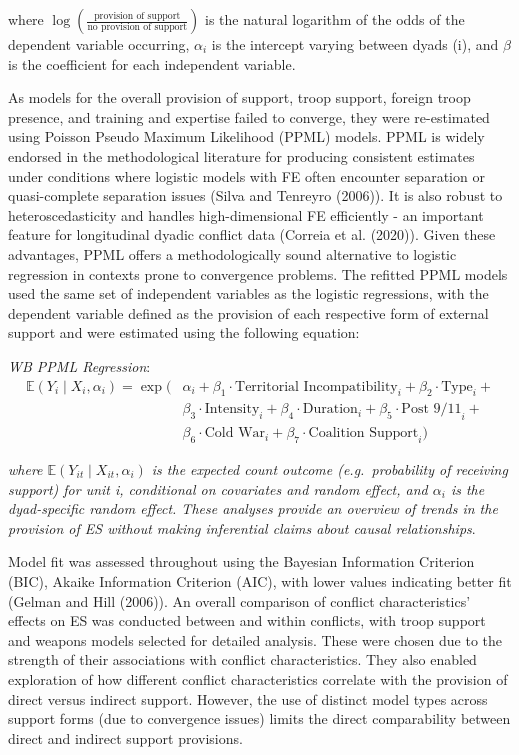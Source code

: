 \documentclass[
]{article}
\begin{document}
where
\(\log \left( \frac{\text{provision of support}}{\text{no provision of support}} \right)\)
is the natural logarithm of the odds of the dependent variable
occurring, \(\alpha_i\) is the intercept varying between dyads (i), and
\(\beta\) is the coefficient for each independent variable.

As models for the overall provision of support, troop support, foreign
troop presence, and training and expertise failed to converge, they were
re-estimated using Poisson Pseudo Maximum Likelihood (PPML) models. PPML
is widely endorsed in the methodological literature for producing
consistent estimates under conditions where logistic models with FE
often encounter separation or quasi-complete separation issues (Silva
and Tenreyro (2006)). It is also robust to heteroscedasticity and
handles high-dimensional FE efficiently - an important feature for
longitudinal dyadic conflict data (Correia et al. (2020)). Given these
advantages, PPML offers a methodologically sound alternative to logistic
regression in contexts prone to convergence problems. The refitted PPML
models used the same set of independent variables as the logistic
regressions, with the dependent variable defined as the provision of
each respective form of external support and were estimated using the
following equation:

\emph{WB PPML Regression}: \[
\begin{aligned}
\mathbb{E}(Y_{i} \mid X_{i}, \alpha_i) = \exp\bigg(&
\alpha_i + 
\beta_1 \cdot \text{Territorial Incompatibility}_{i} + 
\beta_2 \cdot \text{Type}_{i} + \\
&\beta_3 \cdot \text{Intensity}_{i} + 
\beta_4 \cdot \text{Duration}_{i} + 
\beta_5 \cdot \text{Post 9/11}_{i} + \\
&\beta_6 \cdot \text{Cold War}_{i} + 
\beta_7 \cdot \text{Coalition Support}_{i}
\bigg)
\end{aligned}
\]

\emph{where \(\mathbb{E}(Y_{it} \mid X_{it}, \alpha_i)\) is the expected
count outcome (e.g.~probability of receiving support) for unit i,
conditional on covariates and random effect, and \(\alpha_i\) is the
dyad-specific random effect. These analyses provide an overview of
trends in the provision of ES without making inferential claims about
causal relationships}.

Model fit was assessed throughout using the Bayesian Information
Criterion (BIC), Akaike Information Criterion (AIC), with lower values
indicating better fit (Gelman and Hill (2006)). An overall comparison of
conflict characteristics' effects on ES was conducted between and within
conflicts, with troop support and weapons models selected for detailed
analysis. These were chosen due to the strength of their associations
with conflict characteristics. They also enabled exploration of how
different conflict characteristics correlate with the provision of
direct versus indirect support. However, the use of distinct model types
across support forms (due to convergence issues) limits the direct
comparability between direct and indirect support provisions.
\end{document}
